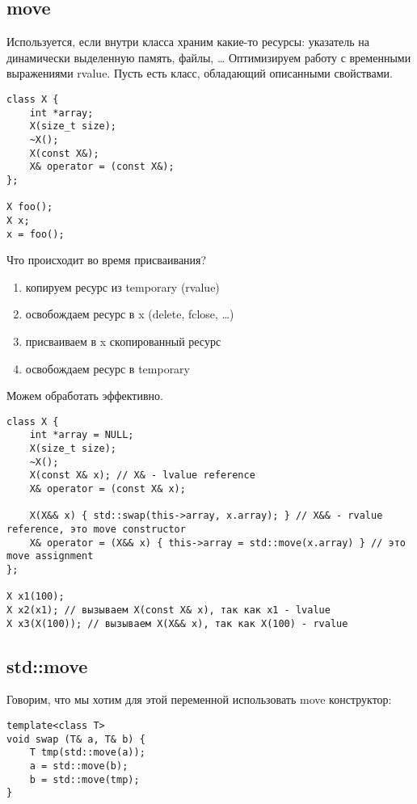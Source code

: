 \subsection{move}
Используется, если внутри класса храним какие-то ресурсы: указатель на динамически выделенную память, файлы, \ldots 
Оптимизируем работу с временными выражениями rvalue.
Пусть есть класс, обладающий описанными свойствами.

\begin{minipage}{0.35\textwidth}
\begin{verbatim}
class X {
    int *array;
	X(size_t size);
	~X();
	X(const X&);
	X& operator = (const X&);
};

X foo();
X x;
x = foo();
\end{verbatim}
\end{minipage}
\hfill
\begin{minipage}{0.55\textwidth}
	Что происходит во время присваивания?
\begin{enumerate}[noitemsep]
	\item копируем ресурс из temporary (rvalue)
	\item освобождаем ресурс в x (delete, fclose, \ldots )
	\item присваиваем в x скопированный ресурс
	\item освобождаем ресурс в temporary
\end{enumerate} 
\end{minipage}
Можем обработать эффективно.
\begin{verbatim}
class X {
    int *array = NULL; 
	X(size_t size);
	~X();
	X(const X& x); // X& - lvalue reference
	X& operator = (const X& x);

	X(X&& x) { std::swap(this->array, x.array); } // X&& - rvalue reference, это move constructor
	X& operator = (X&& x) { this->array = std::move(x.array) } // это move assignment
};

X x1(100);
X x2(x1); // вызываем X(const X& x), так как x1 - lvalue
X x3(X(100)); // вызываем X(X&& x), так как X(100) - rvalue
\end{verbatim}

\subsection{std::move}
Говорим, что мы хотим для этой переменной использовать move конструктор:
\begin{verbatim}
template<class T>
void swap (T& a, T& b) {
	T tmp(std::move(a));
	a = std::move(b);
	b = std::move(tmp);
}
\end{verbatim}
